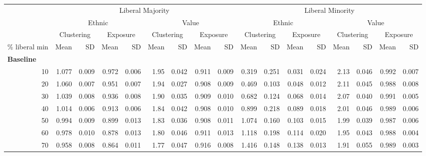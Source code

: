 \documentclass[
]{article}
\begin{document}
\begin{table}[H]
\begin{table}
{\begin{tabular}{r|r|r|r|r|r|r|r|r|r|r|r|r|r|r|r|r}
\hline
\multicolumn{1}{c|}{ } & \multicolumn{8}{c|}{Liberal Majority} & \multicolumn{8}{c}{Liberal Minority} \\
\cline{2-9} \cline{10-17}
\multicolumn{1}{c|}{ } & \multicolumn{4}{c|}{Ethnic} & \multicolumn{4}{c|}{Value} & \multicolumn{4}{c|}{Ethnic} & \multicolumn{4}{c}{Value} \\
\cline{2-5} \cline{6-9} \cline{10-13} \cline{14-17}
\multicolumn{1}{c|}{ } & \multicolumn{2}{c|}{Clustering} & \multicolumn{2}{c|}{Exposure} & \multicolumn{2}{c|}{Clustering} & \multicolumn{2}{c|}{Exposure} & \multicolumn{2}{c|}{Clustering} & \multicolumn{2}{c|}{Exposure} & \multicolumn{2}{c|}{Clustering} & \multicolumn{2}{c}{Exposure} \\
\cline{2-3} \cline{4-5} \cline{6-7} \cline{8-9} \cline{10-11} \cline{12-13} \cline{14-15} \cline{16-17}
\% liberal min & Mean & SD & Mean & SD & Mean & SD & Mean & SD & Mean & SD & Mean & SD & Mean & SD & Mean & SD\\
\hline
\multicolumn{17}{l}{\textbf{Baseline}}\\
\hline
\hspace{1em}10 & 1.077 & 0.009 & 0.972 & 0.006 & 1.95 & 0.042 & 0.911 & 0.009 & 0.319 & 0.251 & 0.031 & 0.024 & 2.13 & 0.046 & 0.992 & 0.007\\
\hline
\hspace{1em}20 & 1.060 & 0.007 & 0.951 & 0.007 & 1.94 & 0.027 & 0.908 & 0.009 & 0.469 & 0.103 & 0.048 & 0.012 & 2.11 & 0.045 & 0.988 & 0.008\\
\hline
\hspace{1em}30 & 1.039 & 0.008 & 0.936 & 0.008 & 1.90 & 0.035 & 0.909 & 0.010 & 0.682 & 0.124 & 0.068 & 0.014 & 2.07 & 0.040 & 0.991 & 0.005\\
\hline
\hspace{1em}40 & 1.014 & 0.006 & 0.913 & 0.006 & 1.84 & 0.042 & 0.908 & 0.010 & 0.899 & 0.218 & 0.089 & 0.018 & 2.01 & 0.046 & 0.989 & 0.006\\
\hline
\hspace{1em}50 & 0.994 & 0.009 & 0.899 & 0.013 & 1.83 & 0.036 & 0.908 & 0.011 & 1.074 & 0.160 & 0.103 & 0.015 & 1.99 & 0.039 & 0.987 & 0.006\\
\hline
\hspace{1em}60 & 0.978 & 0.010 & 0.878 & 0.013 & 1.80 & 0.046 & 0.911 & 0.013 & 1.118 & 0.198 & 0.114 & 0.020 & 1.95 & 0.043 & 0.988 & 0.004\\
\hline
\hspace{1em}70 & 0.958 & 0.008 & 0.864 & 0.011 & 1.77 & 0.047 & 0.916 & 0.008 & 1.416 & 0.148 & 0.138 & 0.013 & 1.91 & 0.055 & 0.989 & 0.003\\

\end{tabular}}
\end{table}
\end{table}
\end{document}
